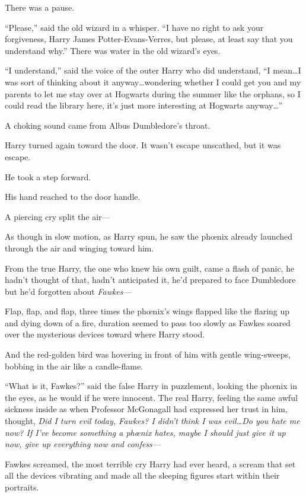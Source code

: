 There was a pause.

“Please,” said the old wizard in a whisper. “I have no right to ask your forgiveness, Harry James Potter-Evans-Verres, but please, at least say that you understand why.” There was water in the old wizard’s eyes.

“I understand,” said the voice of the outer Harry who did understand, “I mean…I was sort of thinking about it anyway…wondering whether I could get you and my parents to let me stay over at Hogwarts during the summer like the orphans, so I could read the library here, it’s just more interesting at Hogwarts anyway…”

A choking sound came from Albus Dumbledore’s throat.

Harry turned again toward the door. It wasn’t escape unscathed, but it was escape.

He took a step forward.

His hand reached to the door handle.

A piercing cry split the air—

As though in slow motion, as Harry spun, he saw the phœnix already launched through the air and winging toward him.

From the true Harry, the one who knew his own guilt, came a flash of panic, he hadn’t thought of that, hadn’t anticipated it, he’d prepared to face Dumbledore but he’d forgotten about \emph{Fawkes—}

Flap, flap, and flap, three times the phœnix’s wings flapped like the flaring up and dying down of a fire, duration seemed to pass too slowly as Fawkes soared over the mysterious devices toward where Harry stood.

And the red-golden bird was hovering in front of him with gentle wing-sweeps, bobbing in the air like a candle-flame.

“What is it, Fawkes?” said the false Harry in puzzlement, looking the phœnix in the eyes, as he would if he were innocent. The real Harry, feeling the same awful sickness inside as when Professor McGonagall had expressed her trust in him, thought, \emph{Did I turn evil today, Fawkes? I didn’t think I was evil…Do you hate me now? If I’ve become something a phœnix hates, maybe I should just give it up now, give up everything now and confess—}

Fawkes screamed, the most terrible cry Harry had ever heard, a scream that set all the devices vibrating and made all the sleeping figures start within their portraits.

